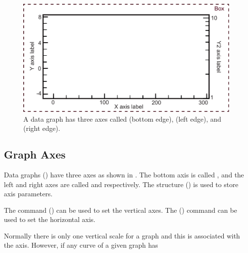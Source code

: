 {{{{\begin{figure}[b]
  \centering
  \includegraphics[width=5.0in]{plot-axes.pdf}
  \caption[Plot axes.]
{A data graph has three axes called  (bottom edge),  (left edge), and  (right edge).}
  \label{f:plot.axes}
\end{figure}

\subsection{Graph Axes}
\label{s:axes}

Data graphs () have three axes as shown in . The bottom axis is
called , and the left and right axes are called  and  respectively. The 
structure () is used to store axis parameters.

The  command () can be used to set the vertical axes. The 
() command can be used to set the horizontal axis.

Normally there is only one vertical scale for a graph and this is associated with the 
axis. However, if any curve of a given graph has \vn{curve%
axis will have an independent second scale. In this case, the \vn{y2} axis numbers will be
drawn. Notice that simply giving the \vn{y2} axis a label does {\em not} make the \vn{y2} axis scale
independent of the \vn{y} axis scale.

\section{Curve}
\label{s:curve.def}

}}}}}
